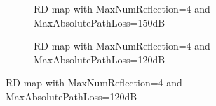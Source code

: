 \documentclass[12pt,DIV14,BCOR12mm,a4paper,footinclude=false,headinclude,parskip=half-,twoside,openright,cleardoublepage=empty,toc=index,bibliography=totoc,listof=totoc]{scrreprt}
\numberwithin{equation}{chapter}
\begin{document}
\begin{figure}[t]
    \centering
    \begin{subfigure}{0.45\textwidth}
        \centering
        \caption{RD map with MaxNumReflection=4 and MaxAbsolutePathLoss=150dB}
        \label{rd map with maxnumreflection=4 and maxabsolutepathloss=150dB}
    \end{subfigure}\hspace{0.5cm}
    \begin{subfigure}{0.45\textwidth}
        \centering
        \caption{RD map with MaxNumReflection=4 and MaxAbsolutePathLoss=120dB}

\end{subfigure}
\end{figure}
\end{document}

